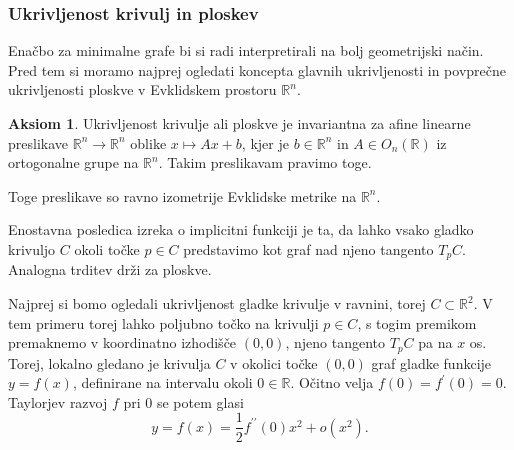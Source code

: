 \documentclass[8pt]{beamer}
\theoremstyle{definition}
\newtheorem{aksiom}{Aksiom}
\theoremstyle{remark}
\theoremstyle{plain}
\numberwithin{equation}{section}  %
\begin{document}
\begin{frame}
    \frametitle{Ukrivljenost krivulj in ploskev}

    Enačbo za minimalne grafe bi si radi interpretirali na bolj geometrijski način. Pred tem si moramo najprej ogledati koncepta glavnih ukrivljenosti in povprečne ukrivljenosti ploskve v Evklidskem prostoru $\mathbb{R}^n$.

    \begin{aksiom}
        Ukrivljenost krivulje ali ploskve je invariantna za afine linearne preslikave $\mathbb{R}^n \rightarrow \mathbb{R}^n$ oblike $x \mapsto A x+b$, kjer je $b \in \mathbb{R}^n$ in $A \in O_n(\mathbb{R})$ iz ortogonalne grupe na $\mathbb{R}^n$. Takim preslikavam pravimo \textcolor{red1}{toge}.
    \end{aksiom}
    Toge preslikave so ravno izometrije Evklidske metrike na $\mathbb{R}^n$. 

    \vspace{0.8em}

    Enostavna posledica izreka o implicitni funkciji je ta, da lahko vsako gladko krivuljo $C$ okoli točke $p \in C$ predstavimo kot graf nad njeno tangento $T_p C$. Analogna trditev drži za ploskve. 
    
    \vspace{0.8em}

    Najprej si bomo ogledali ukrivljenost gladke krivulje v ravnini, torej $C \subset \mathbb{R}^2$. V tem primeru torej lahko poljubno točko na krivulji $p \in C$, s togim premikom premaknemo v koordinatno izhodišče $(0,0)$, njeno tangento $T_p C$ pa na $x$ os. Torej, lokalno gledano je krivulja $C$ v okolici točke $(0,0)$ graf gladke funkcije $y=f(x)$, definirane na intervalu okoli $0 \in \mathbb{R}$. Očitno velja $f(0)=f^{\prime}(0)=0$. Taylorjev razvoj $f$ pri $0$ se potem glasi
    \begin{equation*}
        y=f(x)=\frac{1}{2} f^{\prime \prime}(0) x^2+o\left(x^2\right) .
    \end{equation*}
\end{frame}
\end{document}
